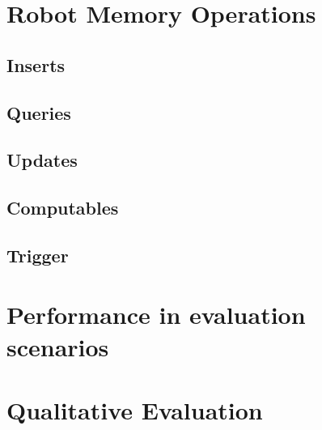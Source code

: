 \section{Robot Memory Operations}
\label{sec:op-durations}
\subsection{Inserts}
\subsection{Queries}
\subsection{Updates}
\subsection{Computables}
\subsection{Trigger}


\section{Performance in evaluation scenarios}
\label{sec:performance}

\section{Qualitative Evaluation}
